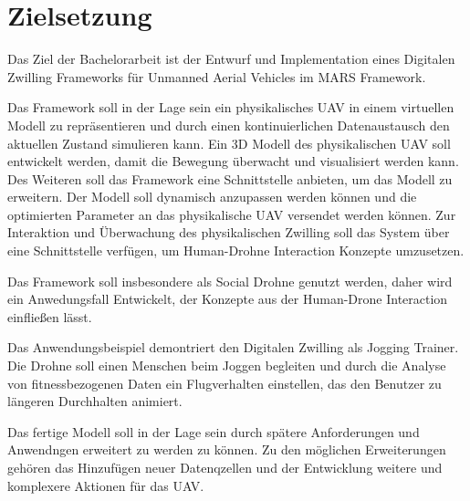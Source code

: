 \section{Zielsetzung}


Das Ziel der Bachelorarbeit ist der Entwurf und Implementation eines Digitalen Zwilling Frameworks für Unmanned Aerial Vehicles im MARS Framework.

Das Framework soll in der Lage sein ein physikalisches UAV in einem virtuellen Modell zu repräsentieren und durch einen kontinuierlichen Datenaustausch den aktuellen Zustand simulieren kann. Ein 3D Modell des physikalischen UAV soll entwickelt werden, damit die Bewegung überwacht und visualisiert werden kann. Des Weiteren soll das Framework eine Schnittstelle anbieten, um das Modell zu erweitern. Der Modell soll dynamisch anzupassen werden können und die optimierten Parameter an das physikalische UAV versendet werden können. Zur Interaktion und Überwachung des physikalischen Zwilling soll das System über eine Schnittstelle verfügen, um Human-Drohne Interaction Konzepte umzusetzen.

Das Framework soll insbesondere als Social Drohne genutzt werden, daher wird ein Anwedungsfall Entwickelt, der Konzepte aus der Human-Drone Interaction einfließen lässt.

Das Anwendungsbeispiel demontriert den Digitalen Zwilling als Jogging Trainer. Die Drohne soll einen Menschen beim Joggen begleiten und durch die Analyse von fitnessbezogenen Daten ein Flugverhalten einstellen, das den Benutzer zu längeren Durchhalten animiert.

Das fertige Modell soll in der Lage sein durch spätere Anforderungen und Anwendngen erweitert zu werden zu können. Zu den möglichen Erweiterungen gehören das Hinzufügen neuer Datenqzellen und der Entwicklung weitere und komplexere Aktionen für das UAV.

